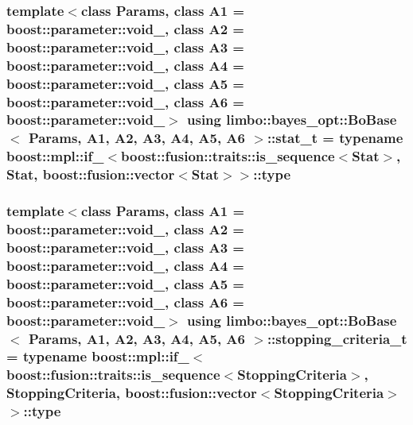 \subsubsection[{\texorpdfstring{stat\+\_\+t}{stat_t}}]{\setlength{\rightskip}{0pt plus 5cm}template$<$class Params, class A1 = boost\+::parameter\+::void\+\_\+, class A2 = boost\+::parameter\+::void\+\_\+, class A3 = boost\+::parameter\+::void\+\_\+, class A4 = boost\+::parameter\+::void\+\_\+, class A5 = boost\+::parameter\+::void\+\_\+, class A6 = boost\+::parameter\+::void\+\_\+$>$ using {\bf limbo\+::bayes\+\_\+opt\+::\+Bo\+Base}$<$ Params, A1, A2, A3, A4, A5, A6 $>$\+::{\bf stat\+\_\+t} =  typename boost\+::mpl\+::if\+\_\+$<$boost\+::fusion\+::traits\+::is\+\_\+sequence$<${\bf Stat}$>$, {\bf Stat}, boost\+::fusion\+::vector$<${\bf Stat}$>$$>$\+::type}\hypertarget{classlimbo_1_1bayes__opt_1_1_bo_base_a407dede091900c86f4bf8001273c26e2}{}\label{classlimbo_1_1bayes__opt_1_1_bo_base_a407dede091900c86f4bf8001273c26e2}
\subsubsection[{\texorpdfstring{stopping\+\_\+criteria\+\_\+t}{stopping_criteria_t}}]{\setlength{\rightskip}{0pt plus 5cm}template$<$class Params, class A1 = boost\+::parameter\+::void\+\_\+, class A2 = boost\+::parameter\+::void\+\_\+, class A3 = boost\+::parameter\+::void\+\_\+, class A4 = boost\+::parameter\+::void\+\_\+, class A5 = boost\+::parameter\+::void\+\_\+, class A6 = boost\+::parameter\+::void\+\_\+$>$ using {\bf limbo\+::bayes\+\_\+opt\+::\+Bo\+Base}$<$ Params, A1, A2, A3, A4, A5, A6 $>$\+::{\bf stopping\+\_\+criteria\+\_\+t} =  typename boost\+::mpl\+::if\+\_\+$<$boost\+::fusion\+::traits\+::is\+\_\+sequence$<${\bf Stopping\+Criteria}$>$, {\bf Stopping\+Criteria}, boost\+::fusion\+::vector$<${\bf Stopping\+Criteria}$>$$>$\+::type}\hypertarget{classlimbo_1_1bayes__opt_1_1_bo_base_af3ce6ecc075e643cb1bdde0fb139ce21}{}\label{classlimbo_1_1bayes__opt_1_1_bo_base_af3ce6ecc075e643cb1bdde0fb139ce21}
